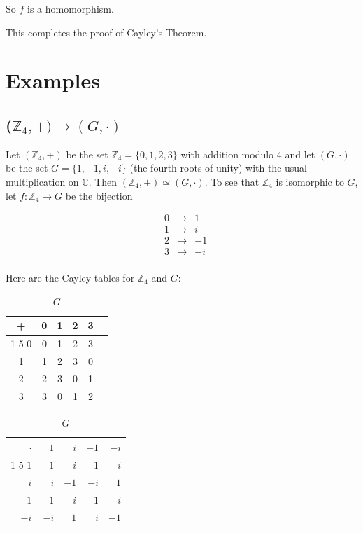 \documentclass{article}
\theoremstyle{definition}
\begin{document}
\bigskip
\noindent
So  $f$ is a homomorphism. 

\bigskip
\noindent
This completes the proof of  Cayley's Theorem.


\section{Examples}


\subsection{($\mathbb{Z}_4,+) \rightarrow (G,\cdot)$}
Let $(\mathbb{Z}_4,+)$ be the set $\mathbb{Z}_4 = \{0,1,2,3\}$ with addition modulo 4 and let $(G,\cdot)$ be the set $G = \{1,-1,i,-i\}$ (the fourth roots of unity) 
with the usual multiplication on $\mathbb{C}$. Then $(\mathbb{Z}_4,+) \simeq (G,\cdot)$. To see that $\mathbb{Z}_4$ is isomorphic to $G$, let 
$f: \mathbb{Z}_4 \rightarrow G$ be the bijection

\begin{equation*}
\begin{array}{lccr}
& 0 &\longrightarrow&  1 \\
& 1 &\longrightarrow&  i \\
& 2 &\longrightarrow&  -1 \\
& 3 &\longrightarrow&  -i \\
\end{array}
\end{equation*}

\bigskip
\noindent
Here are the Cayley tables for $\mathbb{Z}_4$ and $G$:

\bigskip
\begin{table}[ht]
\begin{minipage}{0.5\linewidth} 
\centering
\begin{tabular}{c | c c c c c} 
+ & 0 & 1  & 2 & 3 \\
\cline{1-5}
0 & 0 & 1 & 2 & 3 \\
1 & 1 & 2 & 3 & 0 \\
2 & 2 & 3 & 0 & 1 \\
3 & 3 & 0 & 1 & 2
\end{tabular}
\caption{$\mathbb{Z}_4$} 
\label{tab:z4}
\end{minipage}
%
 \begin{minipage}{0.5\linewidth} 
\centering
\begin{tabular}{r | r r r r} 
$\cdot$ & $1$ & $i$  & $-1$ & $-i$ \\
\cline{1-5}
$1$   & $1$   & $i$     & $-1$   & $-i$  \\
$i$    & $i$    & $-1$   & $-i$    & $1$  \\
$-1$  & $-1$  & $-i$    & $1$    & $i$    \\
$-i$   &  $-i$  & $1$     & $i$     & $-1$
\end{tabular}
\caption{$G$} 
\label{tab:G}
\end{minipage}
\end{table}
\end{document}
